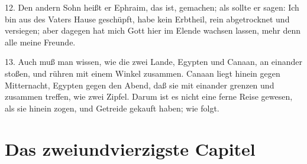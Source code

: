 12. Den andern Sohn heißt er Ephraim, das ist, gemachen; als sollte er sagen: Ich bin aus des Vaters Hause geschüpft, habe kein Erbtheil, rein abgetrocknet und versiegen; aber dagegen hat mich Gott hier im Elende wachsen lassen, mehr denn alle meine Freunde.

13. Auch muß man wissen, wie die zwei Lande, Egypten und Canaan, an einander stoßen, und rühren mit einem Winkel zusammen. Canaan liegt hinein gegen Mitternacht, Egypten gegen den Abend, daß sie mit einander grenzen und zusammen treffen, wie zwei Zipfel. Darum ist es nicht eine ferne Reise gewesen, als sie hinein zogen, und Getreide gekauft haben; wie folgt.

\section{Das zweiundvierzigste Capitel}

